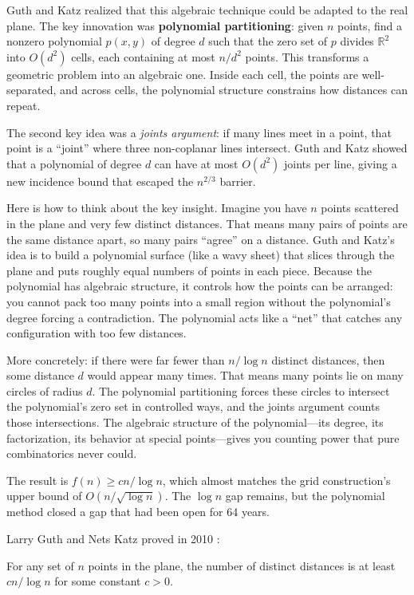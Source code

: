 Guth and Katz realized that this algebraic technique could be adapted to the real plane. The key innovation was \textbf{polynomial partitioning}: given $n$ points, find a nonzero polynomial $p(x,y)$ of degree $d$ such that the zero set of $p$ divides $\mathbb{R}^2$ into $O(d^2)$ cells, each containing at most $n/d^2$ points. This transforms a geometric problem into an algebraic one. Inside each cell, the points are well-separated, and across cells, the polynomial structure constrains how distances can repeat.

The second key idea was a \emph{joints argument}: if many lines meet in a point, that point is a ``joint'' where three non-coplanar lines intersect. Guth and Katz showed that a polynomial of degree $d$ can have at most $O(d^2)$ joints per line, giving a new incidence bound that escaped the $n^{2/3}$ barrier.

Here is how to think about the key insight. Imagine you have $n$ points scattered in the plane and very few distinct distances. That means many pairs of points are the same distance apart, so many pairs ``agree'' on a distance. Guth and Katz's idea is to build a polynomial surface (like a wavy sheet) that slices through the plane and puts roughly equal numbers of points in each piece. Because the polynomial has algebraic structure, it controls how the points can be arranged: you cannot pack too many points into a small region without the polynomial's degree forcing a contradiction. The polynomial acts like a ``net'' that catches any configuration with too few distances.

More concretely: if there were far fewer than $n/\log n$ distinct distances, then some distance $d$ would appear many times. That means many points lie on many circles of radius $d$. The polynomial partitioning forces these circles to intersect the polynomial's zero set in controlled ways, and the joints argument counts those intersections. The algebraic structure of the polynomial---its degree, its factorization, its behavior at special points---gives you counting power that pure combinatorics never could.

The result is $f(n) \ge cn/\log n$, which almost matches the grid construction's upper bound of $O(n/\sqrt{\log n})$. The $\log n$ gap remains, but the polynomial method closed a gap that had been open for 64 years.

Larry Guth and Nets Katz proved in 2010 \cite{guth2015}:

\begin{theorem}
For any set of $n$ points in the plane, the number of distinct distances is at least $cn/\log n$ for some constant $c > 0$.
\end{theorem}

